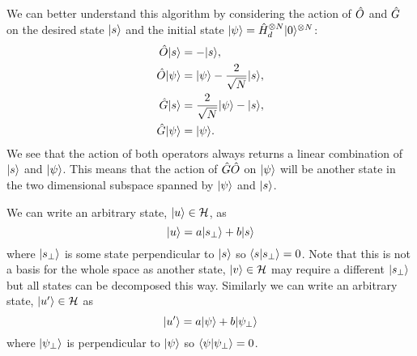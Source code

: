     We can better understand this algorithm by considering the action of \(\hat{O}\) and \(\hat{G}\) on the desired state \(\vert {s} \rangle\) and the initial state \(\vert {\psi} \rangle = \hat{H}_d^{\otimes N}\vert {0} \rangle^{\otimes N}\):
    \begin{align*}
        \hat{O}\vert {s} \rangle &= -\vert {s} \rangle,\\
        \hat{O}\vert {\psi} \rangle &= \vert {\psi} \rangle - \frac{2}{\sqrt{N}}\vert {s} \rangle,\\
        \hat{G}\vert {s} \rangle &= \frac{2}{\sqrt{N}}\vert {\psi} \rangle - \vert {s} \rangle,\\
        \hat{G}\vert {\psi} \rangle &= \vert {\psi} \rangle.
    \end{align*}
    We see that the action of both operators always returns a linear combination of \(\vert {s} \rangle\) and \(\vert {\psi} \rangle\).
    This means that the action of \(\hat{G}\hat{O}\) on \(\vert {\psi} \rangle\) will be another state in the two dimensional subspace spanned by \(\vert {\psi} \rangle\) and \(\vert {s} \rangle\).
    
    We can write an arbitrary state, \(\vert {u} \rangle\in\mathcal{H}\), as
    \[\vert {u} \rangle = a\vert {s_\perp} \rangle + b\vert {s} \rangle\]
    where \(\vert {s_\perp} \rangle\) is some state perpendicular to \(\vert {s} \rangle\) so \(\langle {s} \vert {s_\perp} \rangle = 0\).
    Note that this is not a basis for the whole space as another state, \(\vert {v} \rangle\in\mathcal{H}\) may require a different \(\vert {s_\perp} \rangle\) but all states can be decomposed this way.
    Similarly we can write an arbitrary state, \(\vert {u'} \rangle\in\mathcal{H}\) as
    \[\vert {u'} \rangle = a\vert {\psi} \rangle + b\vert {\psi_\perp} \rangle\]
    where \(\vert {\psi_\perp} \rangle\) is perpendicular to \(\vert {\psi} \rangle\) so \(\langle {\psi} \vert {\psi_\perp} \rangle = 0\).
    
